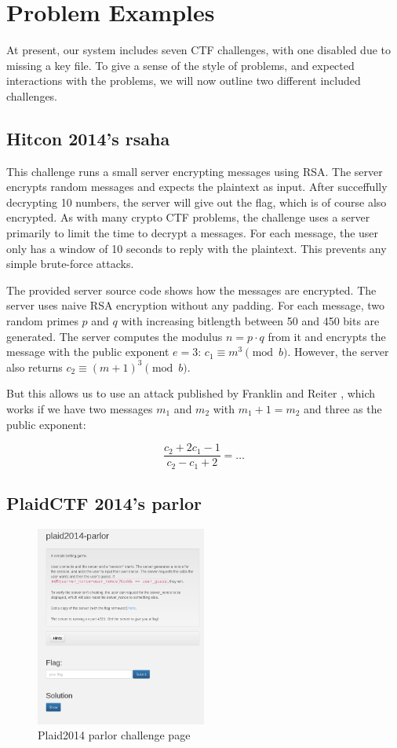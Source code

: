 \section{Problem Examples}
At present, our system includes seven CTF challenges, with one
disabled due to missing a key file. To give a sense of the style of
problems, and expected interactions with the problems, we will now
outline two different included challenges.

\subsection{Hitcon 2014's rsaha}
This challenge runs a small server encrypting messages using RSA. The server encrypts random messages and expects the plaintext as input. After succeffully decrypting 10 numbers, the server will give out the flag, which is of course also encrypted. As with many crypto CTF problems, the challenge uses a server primarily to limit the time to decrypt a messages. For each message, the user only has a window of 10 seconds to reply with the plaintext. This prevents any simple brute-force attacks.

The provided server source code shows how the messages are encrypted. The server uses naive RSA encryption without any padding. For each message, two random primes $p$ and $q$ with increasing bitlength between 50 and 450 bits are generated. The server computes the modulus $n=p\cdot q$ from it and encrypts the message with the public exponent $e=3$: $c_1\equiv m^3 \pmod{b}$. However, the server also returns $c_2\equiv (m+1)^3\pmod{b}$. 

But this allows us to use an attack published by Franklin and Reiter \cite{franklin1995linear}, which works if we have two messages $m_1$ and $m_2$ with $m_1 +1 = m_2$ and three as the public exponent:

\[ \frac{c_2+2c_1-1}{c_2-c_1+2} = \ldots \]

\subsection{PlaidCTF 2014's parlor}

\begin{figure}[h!]
\centering
\includegraphics[width=0.5\textwidth]{parlor_page.png}
\caption{Plaid2014 parlor challenge page}\label{fig:parlor_page}
\end{figure}

